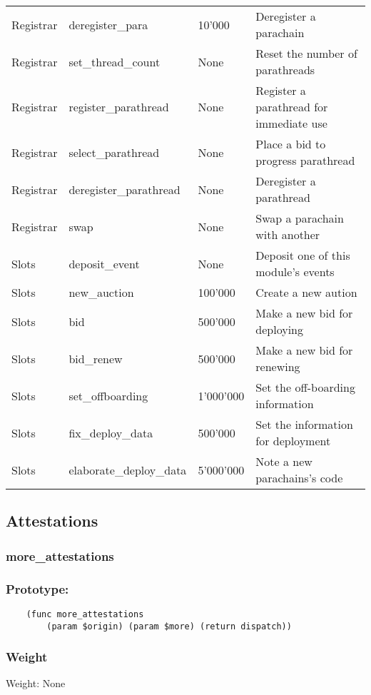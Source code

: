 \documentclass[11pt,a4paper]{article}
\begin{document}
\begin{center}
\begin{tabulary}{1.0\textwidth}{LLLL}
    Registrar & deregister\_para & 10'000 & Deregister a parachain \\
    Registrar & set\_thread\_count & None & Reset the number of parathreads \\
    Registrar & register\_parathread & None & Register a parathread for immediate use \\
    Registrar & select\_parathread & None & Place a bid to progress parathread \\
    Registrar & deregister\_parathread & None & Deregister a parathread \\
    Registrar & swap & None & Swap a parachain with another \\
    Slots & deposit\_event & None & Deposit one of this module's events \\
    Slots & new\_auction & 100'000 & Create a new aution \\
    Slots & bid & 500'000 & Make a new bid for deploying \\
    Slots & bid\_renew & 500'000 & Make a new bid for renewing \\
    Slots & set\_offboarding & 1'000'000 & Set the off-boarding information \\
    Slots & fix\_deploy\_data & 500'000 & Set the information for deployment \\
    Slots & elaborate\_deploy\_data & 5'000'000 & Note a new parachains's code \\
  \end{tabulary}
\end{center}
\newpage

\subsection{Attestations}
\subsubsection{more\_attestations}
\subsubsection*{Prototype:}
\begin{verbatim}
    (func more_attestations
        (param $origin) (param $more) (return dispatch))
\end{verbatim}
\subsubsection*{Weight}
Weight: None
\end{document}
